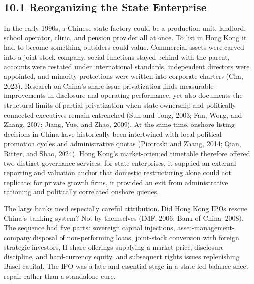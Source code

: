 \documentclass[11pt,letterpaper]{article}
\begin{document}
\subsection*{\texorpdfstring{10.1 Reorganizing the State Enterprise}{10.1 Reorganizing the State Enterprise}}
In the early 1990s, a Chinese state factory could be a production unit, landlord, school operator, clinic, and pension provider all at once. To list in Hong Kong it had to become something outsiders could value. Commercial assets were carved into a joint-stock company, social functions stayed behind with the parent, accounts were restated under international standards, independent directors were appointed, and minority protections were written into corporate charters (Cha, 2023). Research on China's share-issue privatization finds measurable improvements in disclosure and operating performance, yet also documents the structural limits of partial privatization when state ownership and politically connected executives remain entrenched (Sun and Tong, 2003; Fan, Wong, and Zhang, 2007; Jiang, Yue, and Zhao, 2009). At the same time, onshore listing decisions in China have historically been intertwined with local political promotion cycles and administrative quotas (Piotroski and Zhang, 2014; Qian, Ritter, and Shao, 2024). Hong Kong's market-oriented timetable therefore offered two distinct governance services: for state enterprises, it supplied an external reporting and valuation anchor that domestic restructuring alone could not replicate; for private growth firms, it provided an exit from administrative rationing and politically correlated onshore queues.

The large banks need especially careful attribution. Did Hong Kong IPOs rescue China's banking system? Not by themselves (IMF, 2006; Bank of China, 2008). The sequence had five parts: sovereign capital injections, asset-management-company disposal of non-performing loans, joint-stock conversion with foreign strategic investors, H-share offerings supplying a market price, disclosure discipline, and hard-currency equity, and subsequent rights issues replenishing Basel capital. The IPO was a late and essential stage in a state-led balance-sheet repair rather than a standalone cure.
\end{document}
